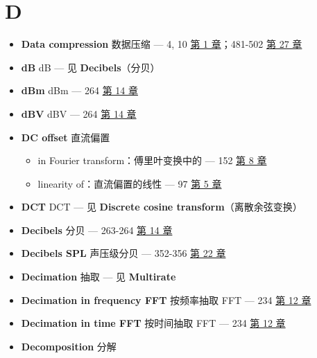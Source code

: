 \section{D}

\begin{itemize}
\tightlist
\item
  \textbf{Data compression} 数据压缩 --- 4, 10 
  \hyperref[ch-01]{第 1 章}；481-502  \hyperref[ch-27]{第 27
  章}
\item
  \textbf{dB} dB --- 见 \textbf{Decibels}（分贝）
\item
  \textbf{dBm} dBm --- 264  \hyperref[ch-14]{第 14 章}
\item
  \textbf{dBV} dBV --- 264  \hyperref[ch-14]{第 14 章}
\item
  \textbf{DC offset} 直流偏置

  \begin{itemize}
  \tightlist
  \item
    in Fourier transform：傅里叶变换中的 --- 152 
    \hyperref[ch-08]{第 8 章}
  \item
    linearity of：直流偏置的线性 --- 97  \hyperref[ch-05]{第 5
    章}
  \end{itemize}
\item
  \textbf{DCT} DCT --- 见 \textbf{Discrete cosine
  transform}（离散余弦变换）
\item
  \textbf{Decibels} 分贝 --- 263-264  \hyperref[ch-14]{第 14
  章}
\item
  \textbf{Decibels SPL} 声压级分贝 --- 352-356 
  \hyperref[ch-22]{第 22 章}
\item
  \textbf{Decimation} 抽取 --- 见 \textbf{Multirate}
\item
  \textbf{Decimation in frequency FFT} 按频率抽取 FFT --- 234 
  \hyperref[ch-12]{第 12 章}
\item
  \textbf{Decimation in time FFT} 按时间抽取 FFT --- 234 
  \hyperref[ch-12]{第 12 章}
\item
  \textbf{Decomposition} 分解


\end{itemize}
